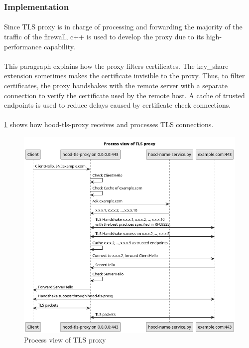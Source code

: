 \documentclass[mscthesis]{usiinfthesis}
\begin{document}
\subsubsection{Implementation}
\paragraph{}
Since TLS proxy is in charge of processing and forwarding the majority of the traffic of the firewall, c++ is used to develop the proxy due to its high-performance capability.
\paragraph{}
This paragraph explains how the proxy filters certificates. The key\_share extension sometimes makes the certificate invisible to the proxy. Thus, to filter certificates, the proxy handshakes with the remote server with a separate connection to verify the certificate used by the remote host. A cache of trusted endpoints is used to reduce delays caused by certificate check connections.
\paragraph{}
\cref{fig:tls-proxy-process-view} shows how hood-tls-proxy receives and processes TLS connections.
\begin{figure}[H]
  \includegraphics[width=\textwidth]{graphics/puml/process-tls-proxy.png}
  \caption{Process view of TLS proxy}
  \label{fig:tls-proxy-process-view}
\end{figure}
\end{document}
